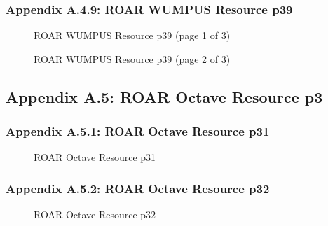 \documentclass{article}[11pt]
\begin{document}
\subsubsection{Appendix A.4.9: ROAR WUMPUS Resource p39}
\begin{figure}[h]
\begin{center}
\end{center}
\caption{ROAR WUMPUS Resource p39 (page 1 of 3)}
\label{fig:roar-wumpus-resource-p39-page1}
\end{figure}
\newline
\begin{figure}[h]
\begin{center}
\end{center}
\caption{ROAR WUMPUS Resource p39 (page 2 of 3)}
\label{fig:roar-wumpus-resource-p39-page2}
\end{figure}
\newline
\newpage

\subsection{Appendix A.5: ROAR Octave Resource p3}
\subsubsection{Appendix A.5.1: ROAR Octave Resource p31}
\begin{figure}[h]
\begin{center}
\end{center}
\caption{ROAR Octave Resource p31}
\label{fig:roar-octave-resource-p31}
\end{figure}
\newline
\subsubsection{Appendix A.5.2: ROAR Octave Resource p32}
\begin{figure}[h]
\begin{center}
\end{center}
\caption{ROAR Octave Resource p32}
\label{fig:roar-octave-resource-p32}
\end{figure}
\newline
\end{document}
